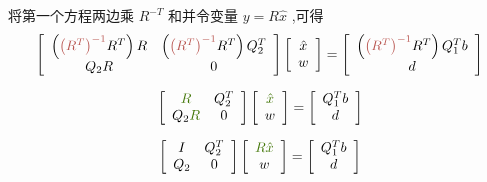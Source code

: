 将第一个方程两边乘 $ R^{-T} $ 和并令变量 $ y=R \hat{x} $ ,可得
\begin{equation}\displaystyle \left[\begin{array}{ c c }
    \left(\textcolor[rgb]{0.72,0.33,0.31}{\left( R^{T}\right)^{-1}} R^{T}\right) R & \left(\textcolor[rgb]{0.72,0.33,0.31}{\left( R^{T}\right)^{-1}} R^{T}\right) Q_{2}^{T}\\
    Q_{2} R & 0
    \end{array}\right]\left[\begin{array}{ c }
    \hat{x}\\
    w
    \end{array}\right] =\left[\begin{array}{ c }
    \left(\textcolor[rgb]{0.72,0.33,0.31}{\left( R^{T}\right)^{-1}} R^{T}\right) Q_{1}^{T} b\\
    d
    \end{array}\right]\end{equation}

\begin{equation}\displaystyle \left[\begin{array}{ c c }
    \textcolor[rgb]{0.25,0.46,0.02}{R} & Q_{2}^{T}\\
    Q_{2}\textcolor[rgb]{0.25,0.46,0.02}{R} & 0
    \end{array}\right]\left[\begin{array}{ c }
    \textcolor[rgb]{0.25,0.46,0.02}{\hat{x}}\\
    w
    \end{array}\right] =\left[\begin{array}{ c }
    Q_{1}^{T} b\\
    d
    \end{array}\right]\end{equation}

\begin{equation}\displaystyle \left[\begin{array}{ c c }
    I & Q_{2}^{T}\\
    Q_{2} & 0
    \end{array}\right]\left[\begin{array}{ c }
    \textcolor[rgb]{0.25,0.46,0.02}{R\hat{x}}\\
    w
    \end{array}\right] =\left[\begin{array}{ c }
    Q_{1}^{T} b\\
    d
    \end{array}\right]\end{equation}

